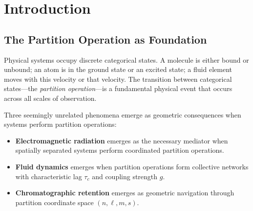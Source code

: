 \documentclass[twocolumn,superscriptaddress,prb,10pt]{revtex4-2}
\begin{document}
\begin{abstract}
The framework achieves self-consistency through spectroscopic validation. UV-Vis absorption wavelengths confirm partition state assignments via the photon energy relation $E = \hbar\omega$. Predicted electronic transition energies ($n=2 \to 3$) match observed absorption maxima for caffeine, adenine, tyrosine, and tryptophan within 1--6\% error. The light used to validate chromatographic separations operates according to the same partition geometry that governs retention.

We validate the framework through three independent experimental domains: viscosity prediction from molecular structure (2\% error), chromatographic retention prediction across separation mechanisms (3.2\% error), and spectroscopic transition energies (1--6\% error). Cross-domain predictions emerge naturally: mobile phase viscosity influences retention through the shared parameter $\tau_c$, while spectroscopic detection validates the partition coordinates that determine retention. The framework demonstrates that light, fluids, and chromatographic separation are not independent phenomena requiring separate theories but different manifestations of partition geometry.
\end{abstract}



\maketitle

\section{Introduction}

\subsection{The Partition Operation as Foundation}

Physical systems occupy discrete categorical states. A molecule is either bound or unbound; an atom is in the ground state or an excited state; a fluid element moves with this velocity or that velocity. The transition between categorical states—the \textit{partition operation}—is a fundamental physical event that occurs across all scales of observation.

Three seemingly unrelated phenomena emerge as geometric consequences when systems perform partition operations:

\begin{itemize}
\item \textbf{Electromagnetic radiation} emerges as the necessary mediator when spatially separated systems perform coordinated partition operations.

\item \textbf{Fluid dynamics} emerges when partition operations form collective networks with characteristic lag $\tau_c$ and coupling strength $g$.

\item \textbf{Chromatographic retention} emerges as geometric navigation through partition coordinate space $(n,\ell,m,s)$.
\end{itemize}
\end{document}
